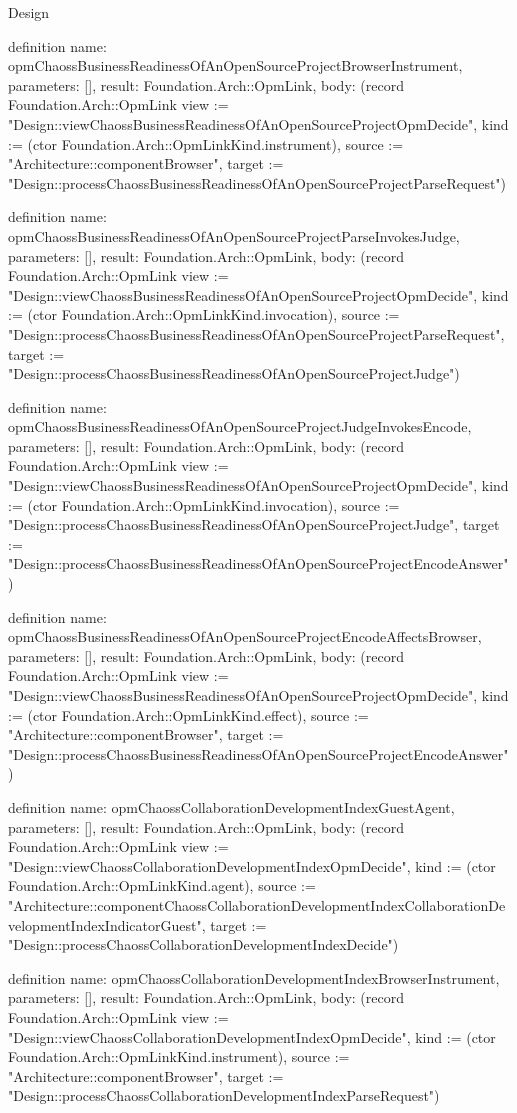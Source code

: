 \begin{lexlean}{Design}
\begin{semanticmodule}
definition{
  name: opmChaossBusinessReadinessOfAnOpenSourceProjectBrowserInstrument,
  parameters: [],
  result: Foundation.Arch::OpmLink,
  body: (record Foundation.Arch::OpmLink {view := "Design::viewChaossBusinessReadinessOfAnOpenSourceProjectOpmDecide", kind := (ctor Foundation.Arch::OpmLinkKind.instrument), source := "Architecture::componentBrowser", target := "Design::processChaossBusinessReadinessOfAnOpenSourceProjectParseRequest"})
}

definition{
  name: opmChaossBusinessReadinessOfAnOpenSourceProjectParseInvokesJudge,
  parameters: [],
  result: Foundation.Arch::OpmLink,
  body: (record Foundation.Arch::OpmLink {view := "Design::viewChaossBusinessReadinessOfAnOpenSourceProjectOpmDecide", kind := (ctor Foundation.Arch::OpmLinkKind.invocation), source := "Design::processChaossBusinessReadinessOfAnOpenSourceProjectParseRequest", target := "Design::processChaossBusinessReadinessOfAnOpenSourceProjectJudge"})
}

definition{
  name: opmChaossBusinessReadinessOfAnOpenSourceProjectJudgeInvokesEncode,
  parameters: [],
  result: Foundation.Arch::OpmLink,
  body: (record Foundation.Arch::OpmLink {view := "Design::viewChaossBusinessReadinessOfAnOpenSourceProjectOpmDecide", kind := (ctor Foundation.Arch::OpmLinkKind.invocation), source := "Design::processChaossBusinessReadinessOfAnOpenSourceProjectJudge", target := "Design::processChaossBusinessReadinessOfAnOpenSourceProjectEncodeAnswer"})
}

definition{
  name: opmChaossBusinessReadinessOfAnOpenSourceProjectEncodeAffectsBrowser,
  parameters: [],
  result: Foundation.Arch::OpmLink,
  body: (record Foundation.Arch::OpmLink {view := "Design::viewChaossBusinessReadinessOfAnOpenSourceProjectOpmDecide", kind := (ctor Foundation.Arch::OpmLinkKind.effect), source := "Architecture::componentBrowser", target := "Design::processChaossBusinessReadinessOfAnOpenSourceProjectEncodeAnswer"})
}

definition{
  name: opmChaossCollaborationDevelopmentIndexGuestAgent,
  parameters: [],
  result: Foundation.Arch::OpmLink,
  body: (record Foundation.Arch::OpmLink {view := "Design::viewChaossCollaborationDevelopmentIndexOpmDecide", kind := (ctor Foundation.Arch::OpmLinkKind.agent), source := "Architecture::componentChaossCollaborationDevelopmentIndexCollaborationDevelopmentIndexIndicatorGuest", target := "Design::processChaossCollaborationDevelopmentIndexDecide"})
}

definition{
  name: opmChaossCollaborationDevelopmentIndexBrowserInstrument,
  parameters: [],
  result: Foundation.Arch::OpmLink,
  body: (record Foundation.Arch::OpmLink {view := "Design::viewChaossCollaborationDevelopmentIndexOpmDecide", kind := (ctor Foundation.Arch::OpmLinkKind.instrument), source := "Architecture::componentBrowser", target := "Design::processChaossCollaborationDevelopmentIndexParseRequest"})
}


\end{semanticmodule}
\end{lexlean}
